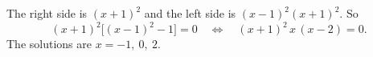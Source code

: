 The right side is $(x+1)^2$ and the left side is $(x-1)^2(x+1)^2$. So
\[
(x+1)^2\bigl[(x-1)^2-1\bigr]=0\quad\Longleftrightarrow\quad (x+1)^2\,x\,(x-2)=0 .
\]
The solutions are $\boxed{x=-1,\ 0,\ 2}$.
